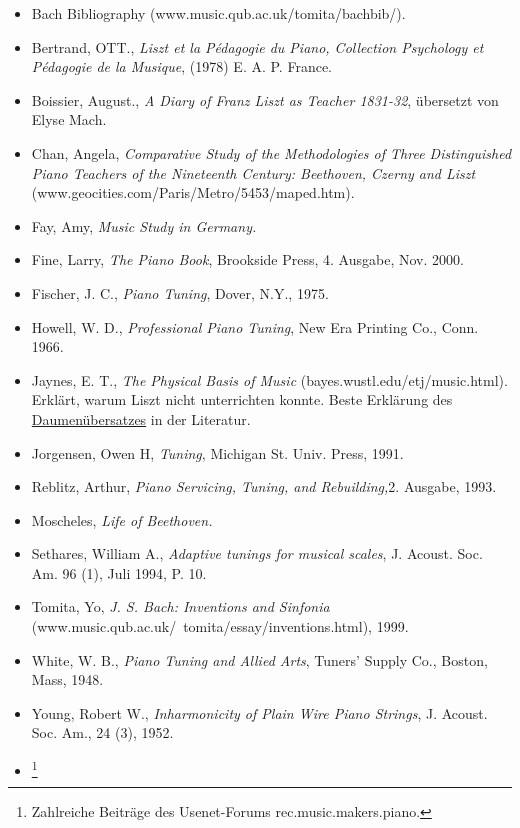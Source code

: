 \begin{itemize} 
 \item Bach Bibliography (www.music.qub.ac.uk/tomita/bachbib/).
 \item Bertrand, OTT., \textit{Liszt et la Pédagogie du Piano, Collection Psychology et Pédagogie de la Musique}, (1978) E. A. P. France.
 \item Boissier, August., \textit{A Diary of Franz Liszt as Teacher 1831-32}, übersetzt von Elyse Mach.
 \item Chan, Angela, \textit{Comparative Study of the Methodologies of Three Distinguished Piano Teachers of the Nineteenth Century: Beethoven, Czerny and Liszt} (www.geocities.com/Paris/Metro/5453/maped.htm).
 \item Fay, Amy, \textit{Music Study in Germany.}
 \item Fine, Larry, \textit{The Piano Book}, Brookside Press, 4. Ausgabe, Nov. 2000.
 \item Fischer, J. C., \textit{Piano Tuning}, Dover, N.Y., 1975.
 \item Howell, W. D., \textit{Professional Piano Tuning}, New Era Printing Co., Conn. 1966.
 \item Jaynes, E. T., \textit{The Physical Basis of Music} (bayes.wustl.edu/etj/music.html).
Erklärt, warum Liszt nicht unterrichten konnte.
Beste Erklärung des \hyperlink{c1iii5a}{Daumenübersatzes} in der 
Literatur.
 \item Jorgensen, Owen H, \textit{Tuning}, Michigan St. Univ. Press, 1991.
 \item Reblitz, Arthur, \textit{Piano Servicing, Tuning, and Rebuilding,}2. Ausgabe, 1993.
 \item Moscheles, \textit{Life of Beethoven.}
 \item Sethares, William A., \textit{Adaptive tunings for musical scales}, J. Acoust. Soc. Am. 96 (1), Juli 1994, P. 10.
 \item Tomita, Yo, \textit{J. S. Bach: Inventions and Sinfonia} (www.music.qub.ac.uk/~tomita/essay/inventions.html), 1999.
 \item White, W. B., \textit{Piano Tuning and Allied Arts}, Tuners' Supply Co., Boston, Mass, 1948.
 \item Young, Robert W., \textit{Inharmonicity of Plain Wire Piano Strings}, J. Acoust. Soc. Am., 24 (3), 1952.
 \item \footnote{Zahlreiche Beiträge des Usenet-Forums rec.music.makers.piano.}
 \end{itemize}

